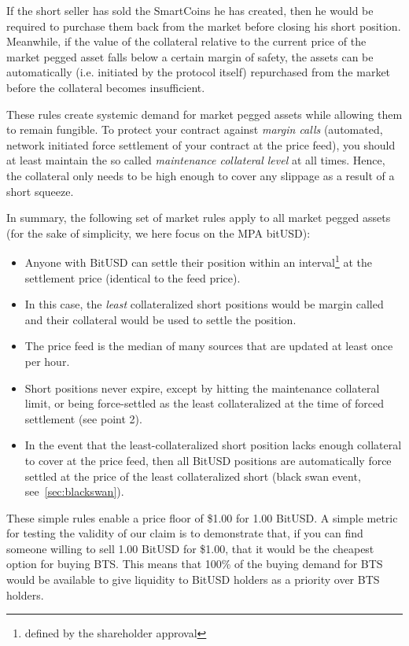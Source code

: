 If the short seller has sold the SmartCoins he has created, then he would be
required to purchase them back from the market before closing his short
position. Meanwhile, if the value of the collateral relative to the current price
of the market pegged asset falls below a certain margin of safety, the assets
can be automatically (i.e. initiated by the protocol itself) repurchased from
the market before the collateral becomes insufficient.

These rules create systemic demand for market pegged assets while allowing them
to remain fungible. To protect your contract against \emph{margin calls}
(automated, network initiated force settlement of your contract at the price
feed), you should at least maintain the so called \emph{maintenance collateral
level} at all times. Hence, the collateral only needs to be high enough to
cover any slippage as a result of a short squeeze.

In summary, the following set of market rules apply to all market pegged assets
(for the sake of simplicity, we here focus on the MPA bitUSD):
\begin{itemize}
 \item Anyone with BitUSD can settle their position within an
       interval\footnote{defined by the shareholder approval} at the settlement
       price (identical to the feed price).
 \item In this case, the \emph{least} collateralized short positions would be
       margin called and their collateral would be used to settle the position.
 \item The price feed is the median of many sources that are updated at least
       once per hour.
 \item Short positions never expire, except by hitting the maintenance
       collateral limit, or being force-settled as the least collateralized at the
       time of forced settlement (see point 2).
 \item In the event that the least-collateralized short position lacks enough
       collateral to cover at the price feed, then all BitUSD positions are
       automatically force settled at the price of the least collateralized
       short (black swan event, see~\cref{sec:blackswan}).
\end{itemize}

These simple rules enable a price floor of \$1.00 for 1.00 BitUSD. A simple
metric for testing the validity of our claim is to demonstrate that, if you can
find someone willing to sell 1.00 BitUSD for \$1.00, that it would be the
cheapest option for buying BTS. This means that 100\% of the buying demand for
BTS would be available to give liquidity to BitUSD holders as a priority over
BTS holders.
